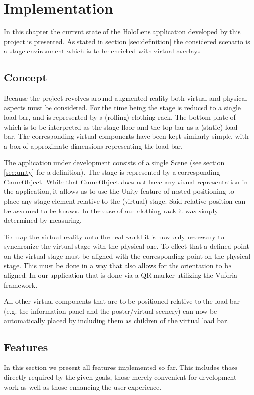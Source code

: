 \chapter{Implementation}
In this chapter the current state of the HoloLens application developed by this project is presented. As stated in section \ref{sec:definition} the considered scenario is a stage environment which is to be enriched with virtual overlays.

\section{Concept}
Because the project revolves around augmented reality both virtual and physical aspects must be considered. For the time being the stage is reduced to a single load bar, and is represented by a (rolling) clothing rack. The bottom plate of which is to be interpreted as the stage floor and the top bar as a (static) load bar. The corresponding virtual components have been kept similarly simple, with a box of approximate dimensions representing the load bar. 

The application under development consists of a single Scene (see section \ref{sec:unity} for a definition). The stage is represented by a corresponding GameObject. While that GameObject does not have any visual representation in the application, it allows us to use the Unity feature of nested positioning to place any stage element relative to the (virtual) stage. Said relative position can be assumed to be known. In the case of our clothing rack it was simply determined by measuring.

To map the virtual reality onto the real world it is now only necessary to synchronize the virtual stage with the physical one. To effect that a defined point on the virtual stage must be aligned with the corresponding point on the physical stage. This must be done in a way that also allows for the orientation to be aligned. In our application that is done via a QR marker utilizing the Vuforia framework.

All other virtual components that are to be positioned relative to the load bar (e.g. the information panel and the poster/virtual scenery) can now be automatically placed by including them as children of the virtual load bar.

\section{Features}
In this section we present all features implemented so far. This includes those directly required by the given goals, those merely convenient for development work as well as those enhancing the user experience. 

